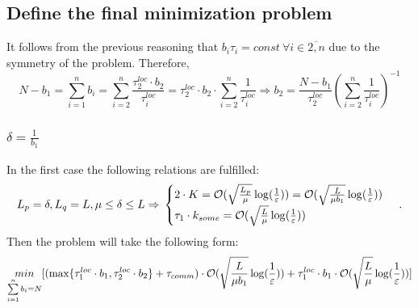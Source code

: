 \documentclass{article}
\begin{document}
\subsection{Define the final minimization problem}
It follows from the previous reasoning that $b_i \tau _i = const ~ \forall i \in \overline{2, n}$ due to the symmetry of the problem.
Therefore, $$ N - b_1 = \sum\limits_{i = 1}^{n} b_i = \sum\limits_{i = 2}^{n} \frac{\tau_2^{loc}\cdot b_2}{\tau_i^{loc}} = \tau_2^{loc}\cdot b_2 \cdot \sum\limits_{i = 2}^{n} \frac{1}{\tau_i^{loc}} \Rightarrow
b_2 = \frac{N - b_1}{\tau_2 ^{loc}}(\sum\limits_{i = 2}^{n} \frac{1}{\tau_i^{loc}})^{-1}$$ 
\subsubsection{$\delta = \frac{1}{b_1}$}
In the first case the following relations are fulfilled:
\begin{equation}
    \notag
    L_p = \delta, L_q = L, \mu \leq \delta \leq L \Rightarrow 
    \\
    \notag
    \begin{cases}
      2\cdot K = \mathcal O(\sqrt{\frac{L_p}{\mu}}\log(\frac{1}{\varepsilon}))  = \mathcal O(\sqrt{\frac{L}{\mu b_1}}\log(\frac{1}{\varepsilon}))\\
      \tau_1\cdot k_{some} = \mathcal O(\sqrt{\frac{L}{\mu}}\log(\frac{1}{\varepsilon}))
    \end{cases}\,.
\end{equation}
Then the problem will take the following form:
\begin{equation}
    \notag
    \underset{\sum\limits_{i = 1}^{n} b_i = N}{min}[(\max\{\tau_1^{loc}\cdot b_1, \tau_2^{loc}\cdot b_2\} + \tau_{comm}) \cdot \mathcal O(\sqrt{\frac{L}{\mu {b_1}}}\log(\frac{1}{\varepsilon})) + \tau_1^{loc}\cdot b_1 \cdot \mathcal O(\sqrt{\frac{L}{\mu}}\log(\frac{1}{\varepsilon}))]
\end{equation}
\end{document}
